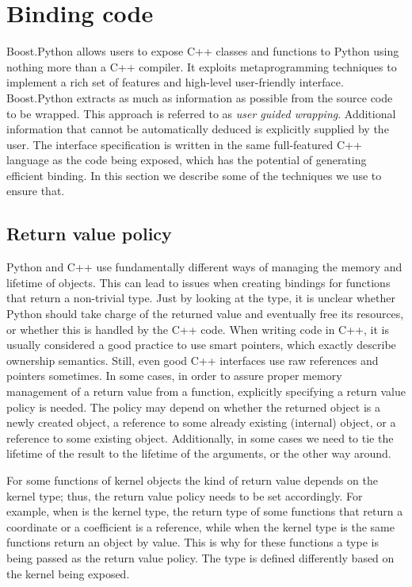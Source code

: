 \section{Binding code}
\label{sec:code}
Boost.Python allows users to expose C++ classes and functions to
Python using nothing more than a C++ compiler. It exploits
metaprogramming techniques to implement a rich set of features and
high-level user-friendly interface. Boost.Python extracts as much as
information as possible from the source code to be wrapped. This
approach is referred to as \emph{user guided wrapping}. Additional
information that cannot be automatically deduced is explicitly
supplied by the user. The interface specification is written in the
same full-featured C++ language as the code being exposed, which has
the potential of generating efficient binding. In this section we
describe some of the techniques we use to ensure that.

\subsection{Return value policy}
\label{sec:code:rvp}
Python and C++ use fundamentally different ways of managing the memory
and lifetime of objects. This can lead to issues when creating
bindings for functions that return a non-trivial type. Just by looking
at the type, it is unclear whether Python should take charge of the
returned value and eventually free its resources, or whether this is
handled by the C++ code. When writing code in C++, it is usually
considered a good practice to use smart pointers, which exactly
describe ownership semantics. Still, even good C++ interfaces use raw
references and pointers sometimes. In some cases, in order to assure
proper memory management of a return value from a function, explicitly
specifying a return value policy is needed. The policy may depend on
whether the returned object is a newly created object, a reference to
some already existing (internal) object, or a  
reference to some existing object. Additionally, in some cases we need 
to tie the lifetime of the result to the lifetime of the arguments, or 
the other way around.

For some functions of kernel objects the kind of return value depends
on the kernel type; thus, the return value policy needs to be set
accordingly. For example, when
 is
the kernel type, the return type of some functions that return a
coordinate or a coefficient is a  reference, 
while when the kernel type is
 the
same functions return an object by value. This is why for these
functions a  type is being
passed as the return value policy. The type is defined differently
based on the kernel being exposed.

